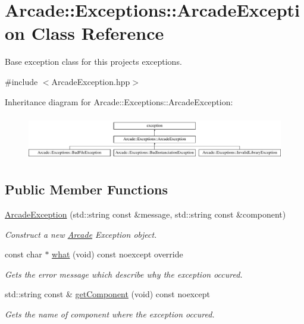 \hypertarget{classArcade_1_1Exceptions_1_1ArcadeException}{}\section{Arcade\+::Exceptions\+::Arcade\+Exception Class Reference}
\label{classArcade_1_1Exceptions_1_1ArcadeException}


Base exception class for this projects\textquotesingle{} exceptions.  




{\ttfamily \#include $<$Arcade\+Exception.\+hpp$>$}

Inheritance diagram for Arcade\+::Exceptions\+::Arcade\+Exception\+:\begin{figure}[H]
\begin{center}
\leavevmode
\includegraphics[height=1.985816cm]{classArcade_1_1Exceptions_1_1ArcadeException}
\end{center}
\end{figure}
\subsection*{Public Member Functions}
\begin{DoxyCompactItemize}
\item 
\mbox{\hyperlink{classArcade_1_1Exceptions_1_1ArcadeException_a054c4f79319af87bfbbe79fa03809b38}{Arcade\+Exception}} (std\+::string const \&message, std\+::string const \&component)
\begin{DoxyCompactList}\small\item\em Construct a new \mbox{\hyperlink{namespaceArcade}{Arcade}} Exception object. \end{DoxyCompactList}\item 
const char $\ast$ \mbox{\hyperlink{classArcade_1_1Exceptions_1_1ArcadeException_ab80ccd97194d7c5484ad4d32135eecd1}{what}} (void) const noexcept override
\begin{DoxyCompactList}\small\item\em Gets the error message which describe why the exception occured. \end{DoxyCompactList}\item 
std\+::string const  \& \mbox{\hyperlink{classArcade_1_1Exceptions_1_1ArcadeException_aa000c618b4fbe4a3612f511074243ce9}{get\+Component}} (void) const noexcept
\begin{DoxyCompactList}\small\item\em Gets the name of component where the exception occured. \end{DoxyCompactList}\end{DoxyCompactItemize}


